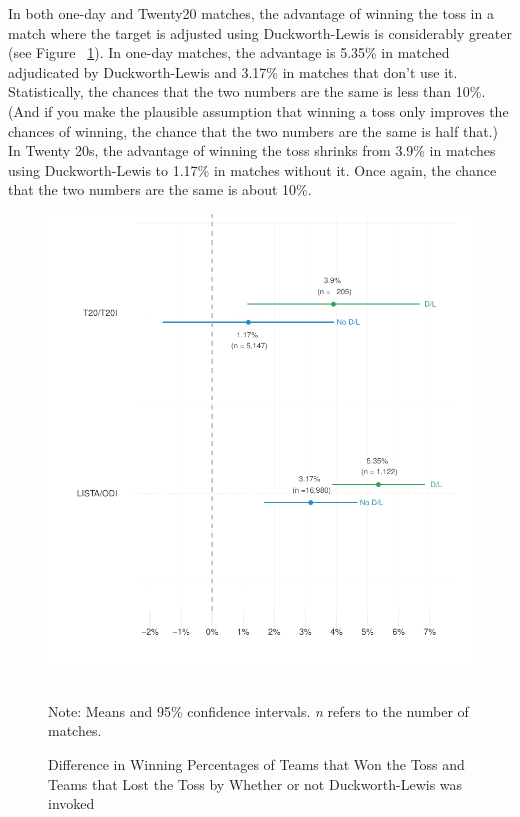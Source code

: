 \documentclass[12pt]{article}
\begin{document}
In both one-day and Twenty20 matches, the advantage of winning the toss in a match where the target is adjusted using Duckworth-Lewis is considerably greater (see Figure ~\ref{fig:dl}). In one-day matches, the advantage is 5.35\% in matched adjudicated by Duckworth-Lewis and 3.17\% in matches that don't use it. Statistically, the chances that the two numbers are the same is less than 10\%. (And if you make the plausible assumption that winning a toss only improves the chances of winning, the chance that the two numbers are the same is half that.) In Twenty 20s, the advantage of winning the toss shrinks from 3.9\% in matches using Duckworth-Lewis to 1.17\% in matches without it. Once again, the chance that the two numbers are the same is about 10\%. 

\begin{figure}[htbp]
\centering
\caption{Difference in Winning Percentages of Teams that Won the Toss and Teams that Lost the Toss by Whether or not Duckworth-Lewis was invoked}
\includegraphics[scale=1]{../figs/winbyDL.pdf}
{\footnotesize \\ Note: Means and 95\% confidence intervals. \emph{n} refers to the number of matches.\par}
\label{fig:dl}
\end{figure}
\end{document}
